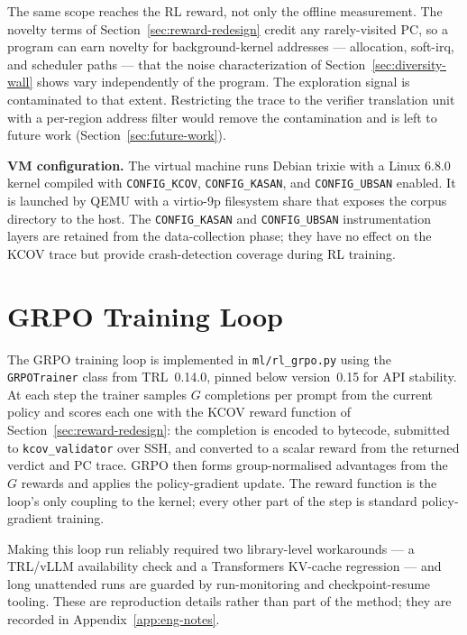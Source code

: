 The same scope reaches the RL reward, not only the offline measurement. The novelty
terms of Section~\ref{sec:reward-redesign} credit any rarely-visited PC, so a program
can earn novelty for background-kernel addresses --- allocation, soft-irq, and
scheduler paths --- that the noise characterization of
Section~\ref{sec:diversity-wall} shows vary independently of the program. The
exploration signal is contaminated to that extent. Restricting the trace to the
verifier translation unit with a per-region address filter would remove the
contamination and is left to future work (Section~\ref{sec:future-work}).

\textbf{VM configuration.}
The virtual machine runs Debian trixie with a Linux 6.8.0 kernel compiled with
\texttt{CONFIG\_KCOV}, \texttt{CONFIG\_KASAN}, and \texttt{CONFIG\_UBSAN} enabled.
It is launched by QEMU with a virtio-9p filesystem share that exposes the corpus
directory to the host.
The \texttt{CONFIG\_KASAN} and \texttt{CONFIG\_UBSAN} instrumentation layers are
retained from the data-collection phase; they have no effect on the KCOV trace
but provide crash-detection coverage during RL training.

\section{GRPO Training Loop}
\label{sec:grpo-loop}

The GRPO training loop is implemented in \texttt{ml/rl\_grpo.py} using the
\texttt{GRPOTrainer} class from TRL~0.14.0, pinned below version~0.15 for API
stability.
At each step the trainer samples $G$ completions per prompt from the current
policy and scores each one with the KCOV reward function of
Section~\ref{sec:reward-redesign}: the completion is encoded to bytecode,
submitted to \texttt{kcov\_validator} over SSH, and converted to a scalar reward
from the returned verdict and PC trace.
GRPO then forms group-normalised advantages from the $G$ rewards and applies the
policy-gradient update.
The reward function is the loop's only coupling to the kernel; every other part
of the step is standard policy-gradient training.

Making this loop run reliably required two library-level workarounds --- a
TRL/vLLM availability check and a Transformers KV-cache regression --- and long
unattended runs are guarded by run-monitoring and checkpoint-resume tooling.
These are reproduction details rather than part of the method; they are recorded
in Appendix~\ref{app:eng-notes}.

